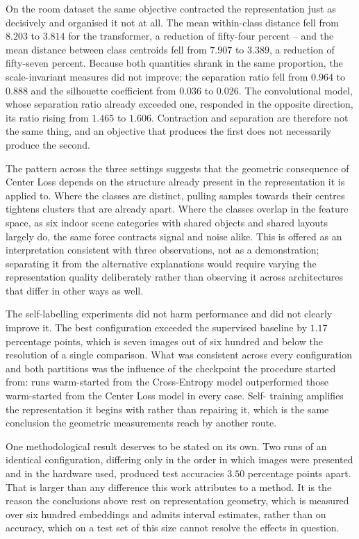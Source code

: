 On the room dataset the same objective contracted the representation just as
decisively and organised it not at all. The mean within-class distance fell from
\(8.203\) to \(3.814\) for the transformer, a reduction of fifty-four percent --
and the mean distance between class centroids fell from \(7.907\) to \(3.389\),
a reduction of fifty-seven percent. Because both quantities shrank in the same
proportion, the scale-invariant measures did not improve: the separation ratio
fell from \(0.964\) to \(0.888\) and the silhouette coefficient from \(0.036\) to
\(0.026\). The convolutional model, whose separation ratio already exceeded one,
responded in the opposite direction, its ratio rising from \(1.465\) to
\(1.606\). Contraction and separation are therefore not the same thing, and an
objective that produces the first does not necessarily produce the second.

The pattern across the three settings suggests that the geometric consequence of
Center Loss depends on the structure already present in the representation it is
applied to. Where the classes are distinct, pulling samples towards their
centres tightens clusters that are already apart. Where the classes overlap in
the feature space, as six indoor scene categories with shared objects and shared
layouts largely do, the same force contracts signal and noise alike. This is
offered as an interpretation consistent with three observations, not as a
demonstration; separating it from the alternative explanations would require
varying the representation quality deliberately rather than observing it across
architectures that differ in other ways as well.

The self-labelling experiments did not harm performance and did not clearly
improve it. The best configuration exceeded the supervised baseline by
\(1.17\) percentage points, which is seven images out of six hundred and below
the resolution of a single comparison. What was consistent across every
configuration and both partitions was the influence of the checkpoint the
procedure started from: runs warm-started from the Cross-Entropy model
outperformed those warm-started from the Center Loss model in every case. Self-
training amplifies the representation it begins with rather than repairing it,
which is the same conclusion the geometric measurements reach by another route.

One methodological result deserves to be stated on its own. Two runs of an
identical configuration, differing only in the order in which images were
presented and in the hardware used, produced test accuracies \(3.50\) percentage
points apart. That is larger than any difference this work attributes to a
method. It is the reason the conclusions above rest on representation geometry,
which is measured over six hundred embeddings and admits interval estimates,
rather than on accuracy, which on a test set of this size cannot resolve the
effects in question.

